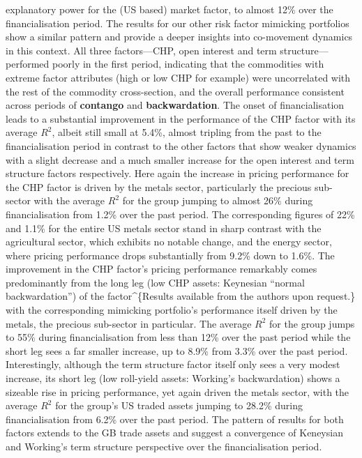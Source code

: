 \documentclass[
  authoryear,
  preprint,
  3p]{elsarticle}
\begin{document}
explanatory power for the (US based) market factor, to almost 12\% over
the financialisation period. The results for our other risk factor
mimicking portfolios show a similar pattern and provide a deeper
insights into co-movement dynamics in this context. All three
factors---CHP, open interest and term structure---performed poorly in
the first period, indicating that the commodities with extreme factor
attributes (high or low CHP for example) were uncorrelated with the rest
of the commodity cross-section, and the overall performance consistent
across periods of \textbf{contango} and \textbf{backwardation}. The
onset of financialisation leads to a substantial improvement in the
performance of the CHP factor with its average \(R^{2}\), albeit still
small at 5.4\%, almost tripling from the past to the financialisation
period in contrast to the other factors that show weaker dynamics with a
slight decrease and a much smaller increase for the open interest and
term structure factors respectively. Here again the increase in pricing
performance for the CHP factor is driven by the metals sector,
particularly the precious sub-sector with the average \(R^{2}\) for the
group jumping to almost 26\% during financialisation from 1.2\% over the
past period. The corresponding figures of 22\% and 1.1\% for the entire
US metals sector stand in sharp contrast with the agricultural sector,
which exhibits no notable change, and the energy sector, where pricing
performance drops substantially from 9.2\% down to 1.6\%. The
improvement in the CHP factor's pricing performance remarkably comes
predominantly from the long leg (low CHP assets: Keynesian ``normal
backwardation'') of the factor\^{}\{Results available from the authors
upon request.\} with the corresponding mimicking portfolio's performance
itself driven by the metals, the precious sub-sector in particular. The
average \(R^{2}\) for the group jumps to 55\% during financialisation
from less than 12\% over the past period while the short leg sees a far
smaller increase, up to 8.9\% from 3.3\% over the past period.
Interestingly, although the term structure factor itself only sees a
very modest increase, its short leg (low roll-yield assets: Working's
backwardation) shows a sizeable rise in pricing performance, yet again
driven the metals sector, with the average \(R^{2}\) for the group's US
traded assets jumping to 28.2\% during financialisation from 6.2\% over
the past period. The pattern of results for both factors extends to the
GB trade assets and suggest a convergence of Keneysian and Working's
term structure perspective over the financialisation period.\\
\end{document}
